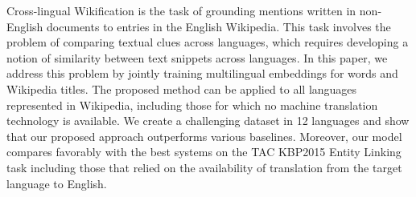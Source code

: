 Cross-lingual Wikification is the task of grounding mentions written in non-English documents to entries in the English Wikipedia. This task involves the problem of comparing textual clues across languages, which requires developing a notion of similarity between text snippets across languages. In this paper, we address this problem by jointly training multilingual embeddings for words and Wikipedia titles. The proposed method can be applied to all languages represented in Wikipedia, including those for which no machine translation technology is available. We create a challenging dataset in 12 languages and show that our proposed approach outperforms various baselines. Moreover, our model compares favorably with the best systems on the TAC KBP2015 Entity Linking task including those that relied on the availability of translation from the target language to English.
